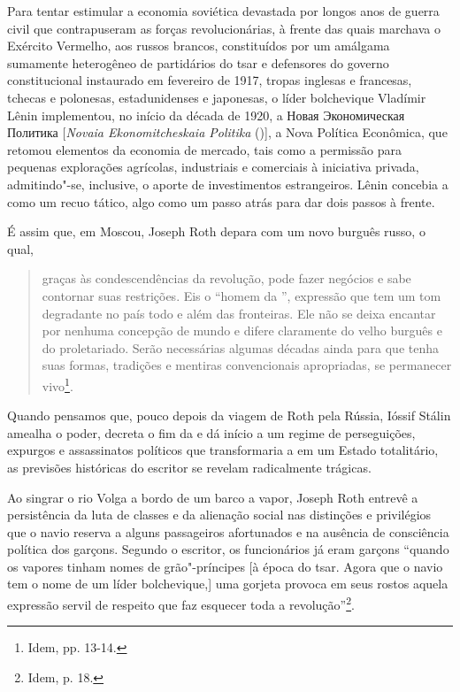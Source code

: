 Para tentar estimular a economia soviética devastada por longos anos de
guerra civil que contrapuseram as forças revolucionárias, à frente das
quais marchava o Exército Vermelho, aos russos brancos, constituídos por
um amálgama sumamente heterogêneo de partidários do tsar e defensores do
governo constitucional instaurado em fevereiro de 1917, tropas inglesas
e francesas, tchecas e polonesas, estadunidenses e japonesas, o líder
bolchevique Vladímir Lênin implementou, no início da década de 1920, a
Новая Экономическая Политика {[}\emph{Novaia Ekonomitcheskaia Politika}
(){]}, a Nova Política Econômica, que retomou elementos da economia
de mercado, tais como a permissão para pequenas explorações agrícolas,
industriais e comerciais à iniciativa privada, admitindo"-se, inclusive,
o aporte de investimentos estrangeiros. Lênin concebia a  como um
recuo tático, algo como um passo atrás para dar dois passos à frente.

É assim que, em Moscou, Joseph Roth depara com um novo burguês russo, o
qual,

\begin{quote}
graças às condescendências da revolução, pode fazer negócios e sabe
contornar suas restrições. Eis o ``homem da '', expressão que tem um
tom degradante no país todo e além das fronteiras. Ele não se deixa
encantar por nenhuma concepção de mundo e difere claramente do velho
burguês e do proletariado. Serão necessárias algumas décadas ainda para
que tenha suas formas, tradições e mentiras convencionais apropriadas,
se permanecer vivo\footnote{Idem, pp. 13-14.}.
\end{quote}

Quando pensamos que, pouco depois da viagem de Roth pela Rússia, Ióssif
Stálin amealha o poder, decreta o fim da  e dá início a um regime de
perseguições, expurgos e assassinatos políticos que transformaria a 
em um Estado totalitário, as previsões históricas do escritor se revelam
radicalmente trágicas.

Ao singrar o rio Volga a bordo de um barco a vapor, Joseph Roth entrevê
a persistência da luta de classes e da alienação social nas distinções e
privilégios que o navio reserva a alguns passageiros afortunados e na
ausência de consciência política dos garçons. Segundo o escritor, os
funcionários já eram garçons ``quando os vapores tinham nomes de
grão"-príncipes {[}à época do tsar. Agora que o navio tem o nome de um
líder bolchevique,{]} uma gorjeta provoca em seus rostos aquela
expressão servil de respeito que faz esquecer toda a
revolução''\footnote{Idem, p. 18.}.

